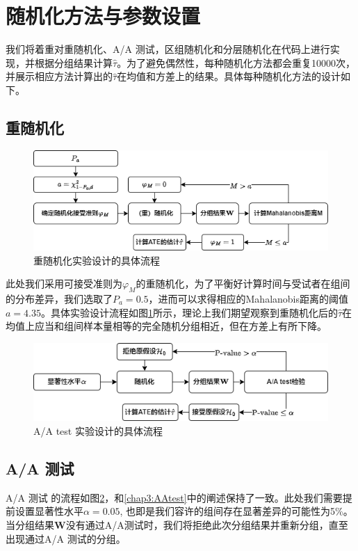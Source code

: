 \section{随机化方法与参数设置}
    我们将着重对重随机化、A/A 测试，区组随机化和分层随机化在代码上进行实现，并根据分组结果计算$\hat\tau$。为了避免偶然性，每种随机化方法都会重复10000次，并展示相应方法计算出的$\hat\tau$在均值和方差上的结果。具体每种随机化方法的设计如下。
    
\subsection{重随机化}
\begin{figure}[!htbp]
    \centering
    \includegraphics[width=0.8\linewidth]{figures/Rerandomization.drawio.png}
    \caption{重随机化实验设计的具体流程}
    \label{fig:RerandomizationDesign}
\end{figure}
此处我们采用可接受准则为$\varphi_M$的重随机化，为了平衡好计算时间与受试者在组间的分布差异，我们选取了$P_a=0.5$，进而可以求得相应的Mahalanobis距离的阈值$a=4.35$。具体实验设计流程如图\ref{fig:RerandomizationDesign}所示，理论上我们期望观察到重随机化后的$\hat{\tau}$在均值上应当和组间样本量相等的完全随机分组相近，但在方差上有所下降。

\begin{figure}[!htbp]
    \centering
    \includegraphics[width=0.8\linewidth]{figures/Chapter4AAtest.drawio.png}
    \caption{A/A test 实验设计的具体流程}
    \label{fig:AAtestDesign}
\end{figure}

\subsection{A/A 测试}

A/A 测试 的流程如图\ref{fig:AAtestDesign}，和\ref{chap3:AAtest}中的阐述保持了一致。此处我们需要提前设置显著性水平$\alpha=0.05$, 也即是我们容许的组间存在显著差异的可能性为5\%。当分组结果$\mathbf{W}$没有通过A/A测试时，我们将拒绝此次分组结果并重新分组，直至出现通过A/A 测试的分组。

